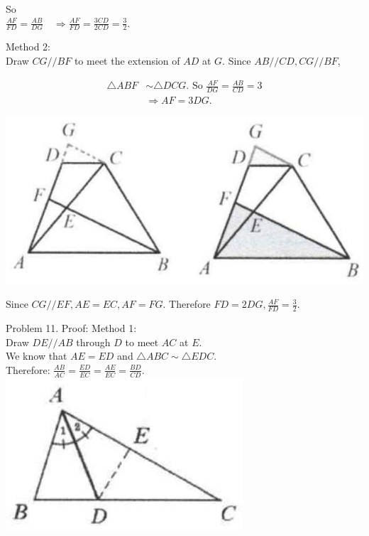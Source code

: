 \documentclass[10pt]{article}
\begin{document}
So\\
\(\frac{A F}{F D}=\frac{A B}{D G} \quad \Rightarrow \frac{A F}{F D}=\frac{3 C D}{2 C D}=\frac{3}{2}\).

Method 2:\\
Draw \(C G / / B F\) to meet the extension of \(A D\) at \(G\). Since \(A B / / C D, C G / / B F\),

\[
\begin{aligned}
\triangle A B F & \sim \triangle D C G . \text { So } \frac{A F}{D G}=\frac{A B}{C D}=3 \\
& \Rightarrow A F=3 D G .
\end{aligned}
\]

\begin{center}
\includegraphics[max width=\textwidth]{2025_04_17_97bc1f7e44d93c271a88g-136(3)}
\end{center}

Since \(C G / / E F, A E=E C, A F=F G\). Therefore \(F D=2 D G, \frac{A F}{F D}=\frac{3}{2}\).

Problem 11. Proof:
Method 1:\\
Draw \(D E / / A B\) through \(D\) to meet \(A C\) at \(E\).\\
We know that \(A E=E D\) and \(\triangle A B C \sim \triangle E D C\).\\
Therefore: \(\frac{A B}{A C}=\frac{E D}{E C}=\frac{A E}{E C}=\frac{B D}{C D}\).\\
\includegraphics[max width=\textwidth, center]{2025_04_17_97bc1f7e44d93c271a88g-136(2)}
\end{document}
